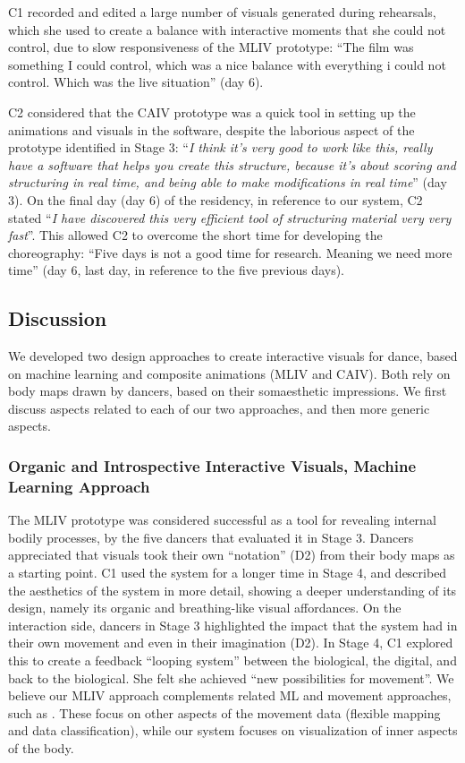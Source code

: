 C1 recorded and edited a large number of visuals generated during rehearsals, which she used to create a balance with interactive moments that she could not control, due to slow responsiveness of the MLIV prototype: “The film was something I could control, which was a nice balance with everything i could not control. Which was the live situation” (day 6).

C2 considered that the CAIV prototype was a quick tool in setting up the animations and visuals in the software, despite the laborious aspect of the prototype identified in Stage 3: 
“\textit{I think it's very good to work like this, really have a software that helps you create this structure, because it's about scoring and structuring in real time, and being able to make modifications in real time}” (day 3). On the final day (day 6) of the residency, in reference to our system, C2 stated “\textit{I have discovered this very efficient tool of structuring material very very fast}”. This allowed C2 to overcome the short time for developing the choreography: “Five days is not a good time for research. Meaning we need more time” (day 6, last day, in reference to the five previous days).

\subsection{Discussion}

We developed two design approaches to create interactive visuals for dance, based on machine learning and composite animations (MLIV and CAIV). Both rely on body maps drawn by dancers, based on their somaesthetic impressions. We first discuss aspects related to each of our two approaches, and then more generic aspects.

\subsubsection{Organic and Introspective Interactive Visuals, Machine Learning Approach}

The MLIV prototype was considered successful as a tool for revealing internal bodily processes, by the five dancers that evaluated it in Stage 3. Dancers appreciated that visuals took their own “notation” (D2) from their body maps as a starting point. C1 used the system for a longer time in Stage 4, and described the aesthetics of the system in more detail, showing a deeper understanding of its design, namely its organic and breathing-like visual affordances. On the interaction side, dancers in Stage 3 highlighted the impact that the system had in their own movement and even in their imagination (D2). In Stage 4, C1 explored this to create a feedback “looping system” between the biological, the digital, and back to the biological. She felt she achieved “new possibilities for movement”. We believe our MLIV approach complements related ML and movement approaches, such as \cite{murray-browne_latent_2021,silang_maranan_designing_2014}. These focus on other aspects of the movement data (flexible mapping and data classification), while our system focuses on visualization of inner aspects of the body.


